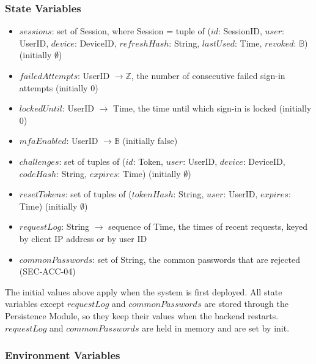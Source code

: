 \documentclass[12pt, titlepage]{article}
\begin{document}
\subsubsection{State Variables}

\begin{itemize}
\item $\mathit{sessions}$: set of Session, where Session = tuple of
  ($\mathit{id}$: SessionID, $\mathit{user}$: UserID, $\mathit{device}$:
  DeviceID, $\mathit{refreshHash}$: String, $\mathit{lastUsed}$: Time,
  $\mathit{revoked}$: $\mathbb{B}$) (initially $\emptyset$)
\item $\mathit{failedAttempts}$: UserID $\rightarrow \mathbb{Z}$, the number
  of consecutive failed sign-in attempts (initially 0)
\item $\mathit{lockedUntil}$: UserID $\rightarrow$ Time, the time until which
  sign-in is locked (initially 0)
\item $\mathit{mfaEnabled}$: UserID $\rightarrow \mathbb{B}$ (initially false)
\item $\mathit{challenges}$: set of tuples of ($\mathit{id}$: Token,
  $\mathit{user}$: UserID, $\mathit{device}$: DeviceID, $\mathit{codeHash}$:
  String, $\mathit{expires}$: Time) (initially $\emptyset$)
\item $\mathit{resetTokens}$: set of tuples of ($\mathit{tokenHash}$: String,
  $\mathit{user}$: UserID, $\mathit{expires}$: Time) (initially $\emptyset$)
\item $\mathit{requestLog}$: String $\rightarrow$ sequence of Time, the times
  of recent requests, keyed by client IP address or by user ID
\item $\mathit{commonPasswords}$: set of String, the common passwords that are
  rejected (SEC-ACC-04)
\end{itemize}

\noindent The initial values above apply when the system is first deployed.
All state variables except $\mathit{requestLog}$ and
$\mathit{commonPasswords}$ are stored through the Persistence Module, so they
keep their values when the backend restarts. $\mathit{requestLog}$ and
$\mathit{commonPasswords}$ are held in memory and are set by init.

\subsubsection{Environment Variables}
\end{document}
